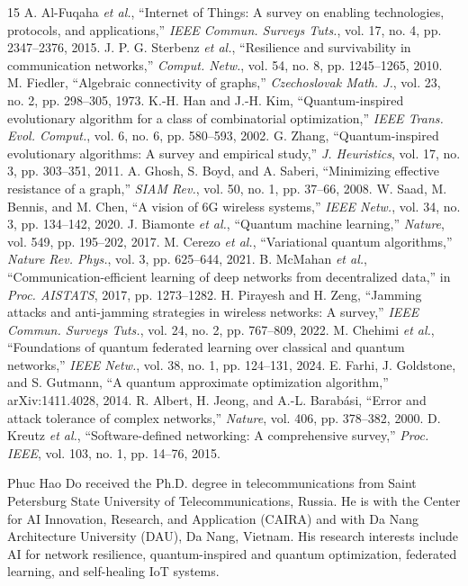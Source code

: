 \documentclass[journal]{IEEEtran}
\begin{document}
\begin{thebibliography}{15}
 A. Al-Fuqaha \textit{et al.}, ``Internet of Things: A survey on enabling technologies, protocols, and applications,'' \textit{IEEE Commun. Surveys Tuts.}, vol. 17, no. 4, pp. 2347--2376, 2015.
 J. P. G. Sterbenz \textit{et al.}, ``Resilience and survivability in communication networks,'' \textit{Comput. Netw.}, vol. 54, no. 8, pp. 1245--1265, 2010.
 M. Fiedler, ``Algebraic connectivity of graphs,'' \textit{Czechoslovak Math. J.}, vol. 23, no. 2, pp. 298--305, 1973.
 K.-H. Han and J.-H. Kim, ``Quantum-inspired evolutionary algorithm for a class of combinatorial optimization,'' \textit{IEEE Trans. Evol. Comput.}, vol. 6, no. 6, pp. 580--593, 2002.
 G. Zhang, ``Quantum-inspired evolutionary algorithms: A survey and empirical study,'' \textit{J. Heuristics}, vol. 17, no. 3, pp. 303--351, 2011.
 A. Ghosh, S. Boyd, and A. Saberi, ``Minimizing effective resistance of a graph,'' \textit{SIAM Rev.}, vol. 50, no. 1, pp. 37--66, 2008.
 W. Saad, M. Bennis, and M. Chen, ``A vision of 6G wireless systems,'' \textit{IEEE Netw.}, vol. 34, no. 3, pp. 134--142, 2020.
 J. Biamonte \textit{et al.}, ``Quantum machine learning,'' \textit{Nature}, vol. 549, pp. 195--202, 2017.
 M. Cerezo \textit{et al.}, ``Variational quantum algorithms,'' \textit{Nature Rev. Phys.}, vol. 3, pp. 625--644, 2021.
 B. McMahan \textit{et al.}, ``Communication-efficient learning of deep networks from decentralized data,'' in \textit{Proc. AISTATS}, 2017, pp. 1273--1282.
 H. Pirayesh and H. Zeng, ``Jamming attacks and anti-jamming strategies in wireless networks: A survey,'' \textit{IEEE Commun. Surveys Tuts.}, vol. 24, no. 2, pp. 767--809, 2022.
 M. Chehimi \textit{et al.}, ``Foundations of quantum federated learning over classical and quantum networks,'' \textit{IEEE Netw.}, vol. 38, no. 1, pp. 124--131, 2024.
 E. Farhi, J. Goldstone, and S. Gutmann, ``A quantum approximate optimization algorithm,'' arXiv:1411.4028, 2014.
 R. Albert, H. Jeong, and A.-L. Barab\'asi, ``Error and attack tolerance of complex networks,'' \textit{Nature}, vol. 406, pp. 378--382, 2000.
 D. Kreutz \textit{et al.}, ``Software-defined networking: A comprehensive survey,'' \textit{Proc. IEEE}, vol. 103, no. 1, pp. 14--76, 2015.
\end{thebibliography}

\begin{IEEEbiographynophoto}{Phuc Hao Do}
received the Ph.D. degree in telecommunications from Saint Petersburg State University of Telecommunications, Russia. He is with the Center for AI Innovation, Research, and Application (CAIRA) and with Da Nang Architecture University (DAU), Da Nang, Vietnam. His research interests include AI for network resilience, quantum-inspired and quantum optimization, federated learning, and self-healing IoT systems.
\end{IEEEbiographynophoto}
\end{document}
